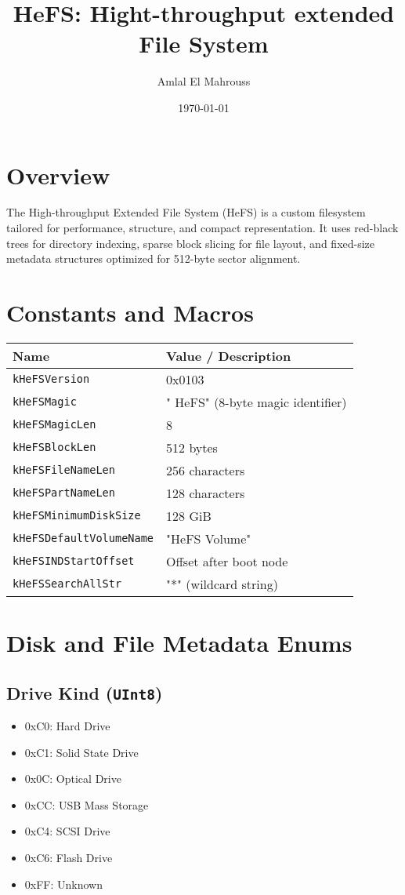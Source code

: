 \documentclass{article}
\title{HeFS: Hight-throughput extended File System}
\author{Amlal El Mahrouss}
\date{\today}
\begin{document}
\maketitle

\section{Overview}
The High-throughput Extended File System (HeFS) is a custom filesystem tailored for performance, structure, and compact representation. It uses red-black trees for directory indexing, sparse block slicing for file layout, and fixed-size metadata structures optimized for 512-byte sector alignment.

\section{Constants and Macros}
\begin{longtable}{|l|l|}
\hline
\textbf{Name} & \textbf{Value / Description} \\
\hline
\texttt{kHeFSVersion} & 0x0103 \\
\texttt{kHeFSMagic} & "  HeFS" (8-byte magic identifier) \\
\texttt{kHeFSMagicLen} & 8 \\
\texttt{kHeFSBlockLen} & 512 bytes \\
\texttt{kHeFSFileNameLen} & 256 characters \\
\texttt{kHeFSPartNameLen} & 128 characters \\
\texttt{kHeFSMinimumDiskSize} & 128 GiB \\
\texttt{kHeFSDefaultVolumeName} & "HeFS Volume" \\
\texttt{kHeFSINDStartOffset} & Offset after boot node \\
\texttt{kHeFSSearchAllStr} & "*" (wildcard string) \\
\hline
\end{longtable}

\section{Disk and File Metadata Enums}\label{sec:disk-and-file-metadata-enums}

\subsection{Drive Kind (\texttt{UInt8})}\label{subsec:drive-kind-(texttt{uint8})}
\begin{itemize}
\item 0xC0: Hard Drive
\item 0xC1: Solid State Drive
\item 0x0C: Optical Drive
\item 0xCC: USB Mass Storage
\item 0xC4: SCSI Drive
\item 0xC6: Flash Drive
\item 0xFF: Unknown
\end{itemize}
\end{document}
